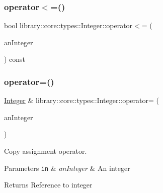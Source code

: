 \subsubsection{\texorpdfstring{operator$<$=()}{operator<=()}\hspace{0.1cm}{\footnotesize\ttfamily [2/2]}}
{\footnotesize\ttfamily bool library\+::core\+::types\+::\+Integer\+::operator$<$= (\begin{DoxyParamCaption}\item[{const \hyperlink{classlibrary_1_1core_1_1types_1_1_integer_a623afb1580f870fd8a1997b1c12c917d}{Integer\+::\+Value\+Type} \&}]{an\+Integer }\end{DoxyParamCaption}) const}

\mbox{\label{classlibrary_1_1core_1_1types_1_1_integer_ab77cae94a9e6d4a405a555dd55763ea2}} 
\subsubsection{\texorpdfstring{operator=()}{operator=()}}
{\footnotesize\ttfamily \hyperlink{classlibrary_1_1core_1_1types_1_1_integer}{Integer} \& library\+::core\+::types\+::\+Integer\+::operator= (\begin{DoxyParamCaption}\item[{\hyperlink{classlibrary_1_1core_1_1types_1_1_integer_a623afb1580f870fd8a1997b1c12c917d}{Integer\+::\+Value\+Type}}]{an\+Integer }\end{DoxyParamCaption})}



Copy assignment operator. 


\begin{DoxyParams}[1]{Parameters}
\mbox{\tt in}  & {\em an\+Integer} & An integer \\
\hline
\end{DoxyParams}
\begin{DoxyReturn}{Returns}
Reference to integer 
\end{DoxyReturn}
\mbox{\label{classlibrary_1_1core_1_1types_1_1_integer_a52b3a012d6c6779773d051800daac516}} 
